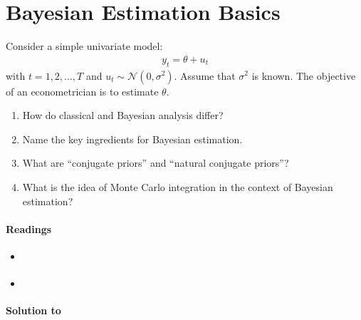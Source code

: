 \section[Bayesian Estimation Basics]{Bayesian Estimation Basics\label{ex:BayesianEstimationBasics}}
Consider a simple univariate model:
\begin{align*}
y_t = \theta + u_t
\end{align*}
with \(t = 1, 2,\ldots , T\) and \(u_t \sim \mathcal{N}(0,\sigma^2)\).
Assume that \(\sigma^2\) is known.
The objective of an econometrician is to estimate \(\theta \).
\begin{enumerate}
\item How do classical and Bayesian analysis differ?
\item Name the key ingredients for Bayesian estimation.
\item What are \enquote{conjugate priors} and \enquote{natural conjugate priors}?
\item What is the idea of Monte Carlo integration in the context of Bayesian estimation?
\end{enumerate}

\paragraph{Readings}
\begin{itemize}
\item \textcite[Part I]{Greenberg_2008_IntroductionBayesianEconometrics}
\item \textcite[Ch.1-2]{Koop_2003_BayesianEconometrics}
\end{itemize}

\begin{solution}\textbf{Solution to }
\ifDisplaySolutions%

\fi
\newpage
\end{solution}